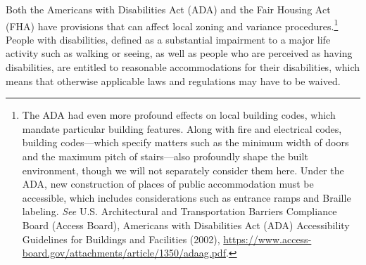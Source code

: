 Both the Americans with Disabilities Act (ADA) and the Fair Housing Act (FHA)
have provisions that can affect local zoning and variance
procedures.\footnote{The ADA had even more profound effects on local building
codes, which mandate particular building features. Along with fire and
electrical codes, building codes---which specify matters such as the minimum
width of doors and the maximum pitch of stairs---also profoundly shape the built
environment, though we will not separately consider them here. Under the ADA,
new construction of places of public accommodation must be accessible, which
includes considerations such as entrance ramps and Braille labeling.
\textit{See} U.S. Architectural and Transportation Barriers Compliance Board
(Access Board), Americans with Disabilities Act (ADA) Accessibility Guidelines
for Buildings and Facilities (2002),
\url{https://www.access-board.gov/attachments/article/1350/adaag.pdf}.}  People
with disabilities, defined as a substantial impairment to a major life activity
such as walking or seeing, as well as people who are perceived as having
disabilities, are entitled to reasonable accommodations for their disabilities,
which means that otherwise applicable laws and regulations may have to be
waived. 

